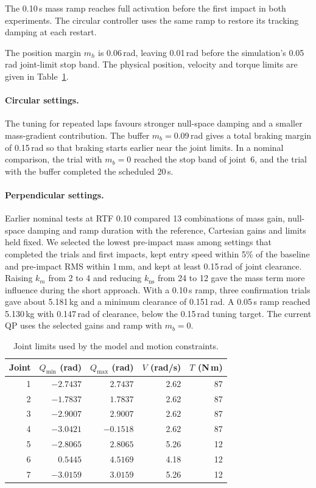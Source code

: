\documentclass[11pt,a4paper]{article}
\begin{document}
The 0.10\,s mass ramp reaches full activation before the first impact in
both experiments.
The circular controller uses the same ramp to restore its tracking
damping at each restart.

The position margin $m_h$ is 0.06\,rad, leaving 0.01\,rad before the
simulation's 0.05\,rad joint-limit stop band. The physical position,
velocity and torque limits are given in Table~\ref{tab:joint-limits}.

\paragraph{Circular settings.}
The tuning for repeated laps favours stronger null-space damping and a
smaller mass-gradient contribution. The buffer $m_b=0.09$\,rad gives a
total braking margin of 0.15\,rad so that braking starts earlier near
the joint limits. In a nominal comparison, the trial with $m_b=0$
reached the stop band of joint~6, and the trial with the buffer completed
the scheduled 20\,s.

\paragraph{Perpendicular settings.}
Earlier nominal tests at RTF 0.10 compared 13 combinations of mass gain,
null-space damping and ramp duration with the reference, Cartesian gains
and limits held fixed. We selected the lowest pre-impact mass among
settings that completed the trials and first impacts, kept entry speed
within 5\% of the baseline and pre-impact RMS within 1\,mm, and kept
at least 0.15\,rad of joint clearance. Raising $k_m$ from 2 to 4 and
reducing $k_{\mathrm{ns}}$ from 24 to 12 gave the mass term more influence
during the short approach. With a 0.10\,s ramp, three confirmation trials
gave about 5.181\,kg and a minimum clearance of 0.151\,rad. A 0.05\,s ramp
reached 5.130\,kg with 0.147\,rad of clearance, below the 0.15\,rad tuning
target. The current QP uses the selected gains and ramp with $m_b=0$.

\begin{table}[htbp]
\centering
\begin{tabular}{rrrrr}
\toprule
Joint & $Q_{\min}$ (rad) & $Q_{\max}$ (rad) & $V$ (rad/s) & $T$ (N\,m)\\
\midrule
1 & $-2.7437$ & $2.7437$ & 2.62 & 87\\
2 & $-1.7837$ & $1.7837$ & 2.62 & 87\\
3 & $-2.9007$ & $2.9007$ & 2.62 & 87\\
4 & $-3.0421$ & $-0.1518$ & 2.62 & 87\\
5 & $-2.8065$ & $2.8065$ & 5.26 & 12\\
6 & $0.5445$ & $4.5169$ & 4.18 & 12\\
7 & $-3.0159$ & $3.0159$ & 5.26 & 12\\
\bottomrule
\end{tabular}
\caption{Joint limits used by the model and motion constraints.}
\label{tab:joint-limits}
\end{table}
\end{document}
